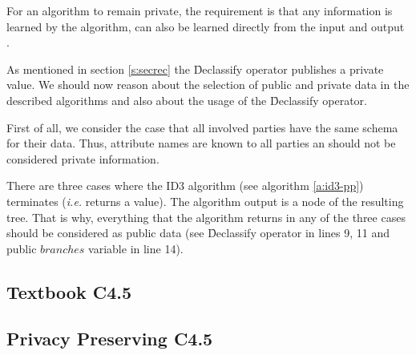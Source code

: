 For an algorithm to remain private, the requirement is that any information is learned by the algorithm, can also be learned directly from the input and output \cite{lindell2000privacy}.

As mentioned in section \ref{s:secrec} the \f{Declassify} operator publishes a private value.
We should now reason about the selection of public and private data in the described algorithms and also about the usage of the \f{Declassify} operator.

First of all, we consider the case that all involved parties have the same schema for their data.
Thus, attribute names are known to all parties an should not be considered private information.

There are three cases where the ID3 algorithm (see algorithm \ref{a:id3-pp}) terminates (\textit{i.e.} returns a value).
The algorithm output is a node of the resulting tree.
That is why, everything that the algorithm returns in any of the three cases should be considered as public data (see \f{Declassify} operator in lines 9, 11 and public $branches$ variable in line 14).
%


\subsection{Textbook C4.5}\label{s:c45}

\subsection{Privacy Preserving C4.5}\label{s:pp-c45}


